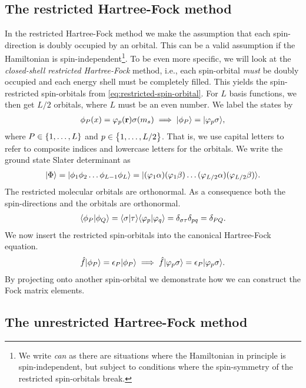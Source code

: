         \subsection{The restricted Hartree-Fock method}
            In the restricted Hartree-Fock method we make the assumption that
            each spin-direction is doubly occupied by an orbital.
            This can be a valid assumption if the Hamiltonian is
            spin-independent\footnote{%
                We write \emph{can} as there are situations where the
                Hamiltonian in principle is spin-independent, but subject to
                conditions where the spin-symmetry of the restricted
                spin-orbitals break.
            }.
            To be even more specific, we will look at the \emph{closed-shell
            restricted Hartree-Fock} method, i.e., each spin-orbital \emph{must}
            be doubly occupied and each energy shell must be completely filled.
            This yields the spin-restricted spin-orbitals from
            \autoref{eq:restricted-spin-orbital}.
            For $L$ basis functions, we then get $L/2$ orbitals, where $L$ must
            be an even number.
            We label the states by
            \begin{align}
                \phi_{P}(x) = \varphi_p(\mathbf{r}) \sigma(m_s)
                \implies
                | \phi_P \rangle = | \varphi_p\sigma \rangle,
            \end{align}
            where $P \in \left\{ 1, \dots, L \right\}$ and $p \in \left\{ 1, \dots, L / 2 \right\}$.
            That is, we use capital letters to refer to composite indices and
            lowercase letters for the orbitals.
            We write the ground state Slater determinant as
            \begin{align}
                | \Phi \rangle = | \phi_1 \phi_2 \dots \phi_{L - 1} \phi_L \rangle
                = | 
                    (\varphi_1 \alpha)
                    (\varphi_1 \beta)
                    \dots
                    (\varphi_{L / 2} \alpha)
                    (\varphi_{L / 2}\beta)
                 \rangle.
            \end{align}
            The restricted molecular orbitals are orthonormal.
            As a consequence both the spin-directions and the orbitals are
            orthonormal.
            \begin{align}
                \langle \phi_P | \phi_Q \rangle
                = \langle \sigma | \tau \rangle
                \langle \varphi_p | \varphi_q \rangle
                = \delta_{\sigma \tau}
                \delta_{pq}
                = \delta_{PQ}.
            \end{align}
            We now insert the restricted spin-orbitals into the canonical
            Hartree-Fock equation.
            \begin{align}
                \hat{f}| \phi_P \rangle = \epsilon_P| \phi_P \rangle
                \implies
                \hat{f}| \varphi_p\sigma \rangle
                = \epsilon_P| \varphi_p\sigma \rangle.
            \end{align}
            By projecting onto another spin-orbital we demonstrate how we can
            construct the Fock matrix elements.

        \subsection{The unrestricted Hartree-Fock method}




